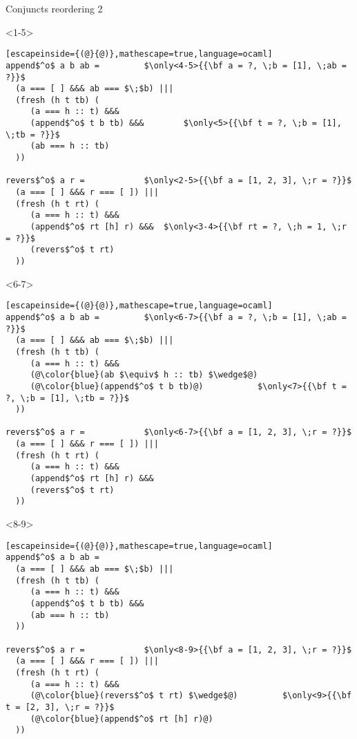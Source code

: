 \documentclass{beamer}
\theoremstyle{definition}
\theoremstyle{plain} %
\begin{document}
\begin{frame}[fragile]{Conjuncts reordering 2}

\begin{onlyenv}<1-5>
\begin{lstlisting}[escapeinside={(@}{@)},mathescape=true,language=ocaml]
append$^o$ a b ab =			$\only<4-5>{{\bf a = ?, \;b = [1], \;ab = ?}}$
  (a === [ ] &&& ab === $\;$b) |||
  (fresh (h t tb) (
     (a === h :: t) &&&
     (append$^o$ t b tb) &&&		$\only<5>{{\bf t = ?, \;b = [1], \;tb = ?}}$
     (ab === h :: tb)  
  ))

revers$^o$ a r =			$\only<2-5>{{\bf a = [1, 2, 3], \;r = ?}}$
  (a === [ ] &&& r === [ ]) |||
  (fresh (h t rt) (
     (a === h :: t) &&&
     (append$^o$ rt [h] r) &&&	$\only<3-4>{{\bf rt = ?, \;h = 1, \;r = ?}}$
     (revers$^o$ t rt)
  ))
 \end{lstlisting}
 \end{onlyenv}
 \begin{onlyenv}<6-7>
\begin{lstlisting}[escapeinside={(@}{@)},mathescape=true,language=ocaml]
append$^o$ a b ab =			$\only<6-7>{{\bf a = ?, \;b = [1], \;ab = ?}}$
  (a === [ ] &&& ab === $\;$b) |||
  (fresh (h t tb) (
     (a === h :: t) &&&
     (@\color{blue}(ab $\equiv$ h :: tb) $\wedge$@)
     (@\color{blue}(append$^o$ t b tb)@)		   $\only<7>{{\bf t = ?, \;b = [1], \;tb = ?}}$
  ))

revers$^o$ a r =			$\only<6-7>{{\bf a = [1, 2, 3], \;r = ?}}$
  (a === [ ] &&& r === [ ]) |||
  (fresh (h t rt) (
     (a === h :: t) &&&
     (append$^o$ rt [h] r) &&&
     (revers$^o$ t rt)
  ))
 \end{lstlisting}
 \end{onlyenv}
 \begin{onlyenv}<8-9>
\begin{lstlisting}[escapeinside={(@}{@)},mathescape=true,language=ocaml]
append$^o$ a b ab =
  (a === [ ] &&& ab === $\;$b) |||
  (fresh (h t tb) (
     (a === h :: t) &&&
     (append$^o$ t b tb) &&&
     (ab === h :: tb)  
  ))

revers$^o$ a r =			$\only<8-9>{{\bf a = [1, 2, 3], \;r = ?}}$
  (a === [ ] &&& r === [ ]) |||
  (fresh (h t rt) (
     (a === h :: t) &&&
     (@\color{blue}(revers$^o$ t rt) $\wedge$@)		    $\only<9>{{\bf t = [2, 3], \;r = ?}}$
     (@\color{blue}(append$^o$ rt [h] r)@)
  ))
 \end{lstlisting}
 \end{onlyenv}

\end{frame}
\end{document}
